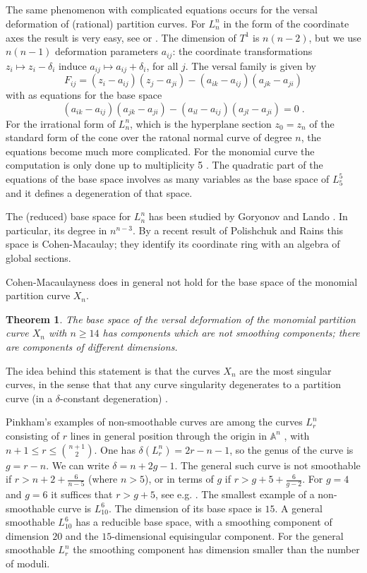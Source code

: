 \documentclass[12pt,a4paper]{amsart}  %
\newcommand{\A}{\mathbb{A}}
\newtheorem{thm}{Theorem}[section]
\theoremstyle{definition}
\theoremstyle{remark}
\begin{document}
\subsection{}
The same  phenomenon with complicated equations  occurs for the versal deformation of (rational)
partition curves. For $L_n^n$ in the form of the coordinate axes
the result is very easy, see \cite{Sch} or
\cite{St}. The dimension of $T^1$ is $n(n-2)$, but we use 
 $n(n-1)$ deformation parameters $a_{ij}$:
  the coordinate
transformations  $z_i\mapsto z_i-\delta_i$ induce
$a_{ij}\mapsto a_{ij}+\delta_i$, for all $j$. 
The versal family is given by 
\[
F_{ij}=(z_i-a_{ij})(z_j-a_{ji})-
(a_{ik}-a_{ij})(a_{jk}-a_{ji})
\] 
with as equations for the base space
\[
(a_{ik}-a_{ij})(a_{jk}-a_{ji})-(a_{il}-a_{ij})(a_{jl}-a_{ji})=0\;.
\]
For the irrational form of  $L_n^n$, which is the hyperplane section
$z_0=z_n$ of the standard form of the  cone over the ratonal normal curve of degree $n$,
the equations become much more complicated. 
For the monomial curve the computation is
only done up to multiplicity 5 \cite{St}. The quadratic part of the equations of the base
space involves as many variables as the base space of $L_5^5$ and it defines 
a degeneration of that space. 

The (reduced)
base space for $L_n^n$ has been studied by Goryonov and Lando \cite{GL}.
In particular, its degree in $n^{n-3}$.  By a recent result of 
Polishchuk and Rains \cite{PR} this space is Cohen-Macaulay; they identify its 
coordinate ring with an algebra of global sections.

Cohen-Macaulayness does  in general  not hold for the base space
of the monomial partition curve $X_n$.

\begin{thm}
The base space of the versal deformation
of the monomial partition curve $X_n$ with $n\geq 14$ has components
which are not smoothing components; there are components of different
dimensions.
\end{thm}

The idea behind this statement is that the curves  $X_n$ are the most singular 
curves, in the sense that that any curve singularity degenerates to a partition curve
(in a $\delta$-constant degeneration) \cite{Boz}.

Pinkham's examples of non-smoothable curves are among the 
 curves $L_r^n$ consisting of $r$ lines in general position
through the origin in $\A^n$ \cite{Pi, Gr}, with $n+1\leq r \leq \binom {n+1}2$.
One has $\delta(L_r^n)= 2r-n-1$, so the genus of the curve is  $g=r-n$.
We can write $\delta= n+2g-1$.
The general such curve is not smoothable if $r> n+2 + \frac6{n-5}$ (where $n>5$),
or in terms of $g$ if $r> g+5 + \frac6{g-2}$. For $g=4$ and $g=6$ it 
suffices that $r> g+5 $, see e.g. \cite{St-ns}.
The smallest example of a non-smoothable curve is $L_{10}^6$. The dimension
of its base space is $15$. A general smoothable  $L_{10}^6$ has a reducible
base space, with a smoothing component of dimension $20$ and the $15$-dimensional
equisingular component. For the general smoothable $L_r^n$ the smoothing component
has dimension smaller than the number of moduli.
\end{document}
